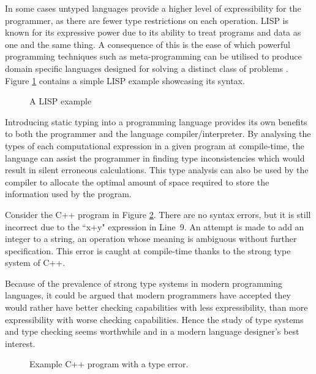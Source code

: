 \documentclass{UoYCSproject}
\begin{document}
In some cases untyped languages provide a higher level of expressibility for
the programmer, as there are fewer type restrictions on each operation.
LISP is known for its expressive power due to its ability to treat programs and
data as one and the same thing. A consequence of this is the ease of which
powerful programming techniques such as meta-programming can be utilised to
produce domain specific languages designed for solving a distinct class of
problems \cite[\S1, p.~5]{SICP}. Figure \ref{fig:SimpleTypedLanguages} contains a
simple LISP example showcasing its syntax.

\begin{figure}
    
    \caption{A LISP example}
    \label{fig:SimpleTypedLanguages}
\end{figure}

Introducing static typing into a programming language provides its own benefits
to both the programmer and the language compiler/interpreter. By analysing the
types of each computational expression in a given program at compile-time,
the language can assist the programmer in finding type
inconsistencies which would result in silent erroneous calculations. This type
analysis can also be used by the compiler to allocate the optimal amount of
space required to store the information used by the program.

Consider the C++ program in Figure \ref{fig:C++TypeError}.
There are no syntax errors, but it is still incorrect due to the
``x+y" expression in Line~9. An attempt is made to add an integer to a string,
an operation whose meaning is ambiguous without further specification. This
error is caught at compile-time thanks to the strong type system of C++.

Because of the prevalence of strong type systems in modern programming
languages, it could be argued that modern programmers have accepted they would
rather have better checking capabilities with less expressibility, than more
expressibility with worse checking capabilities. Hence the study of type systems
and type checking seems worthwhile and in a modern language designer's best
interest.

\begin{figure}


\caption{Example C++ program with a type error.}
\label{fig:C++TypeError}
\end{figure}
\end{document}
